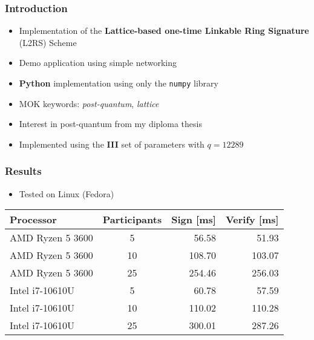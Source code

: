 \documentclass[%
  14pt,       				%
	t,                  %
	aspectratio=1610,   %
	unicode,						%
]{beamer}				    	%
\begin{document}
\disablenavigationsymbols

\maketitle


\begin{frame}[c]
	\frametitle{Introduction}
	\large{
		\begin{itemize}
			\item Implementation of the \textbf{Lattice-based one-time Linkable Ring Signature} (L2RS) Scheme
			\item Demo application using simple networking
			\item \textbf{Python} implementation using only the \texttt{numpy} library
			\item MOK keywords: \textit{post-quantum}, \textit{lattice}
			\item Interest in post-quantum from my diploma thesis
			\item Implemented using the \textbf{III} set of parameters with $q=12289$
		\end{itemize}
	}
\end{frame}


\begin{frame}[c]
	\frametitle{Results}
	\large{
		\begin{itemize}
			\item Tested on Linux (Fedora)
		\end{itemize}
	}
	\begin{table}[htbp]
		\centering
		\begin{tabular}{|l|c|r|r|}
			\hline
			Processor        & Participants & Sign [ms] & Verify [ms] \\
			\hline
			AMD Ryzen 5 3600 & 5            & 56.58     & 51.93       \\
			AMD Ryzen 5 3600 & 10           & 108.70    & 103.07      \\
			AMD Ryzen 5 3600 & 25           & 254.46    & 256.03      \\
			Intel i7-10610U  & 5            & 60.78     & 57.59       \\
			Intel i7-10610U  & 10           & 110.02    & 110.28      \\
			Intel i7-10610U  & 25           & 300.01    & 287.26      \\
			\hline
		\end{tabular}
	\end{table}
\end{frame}
\end{document}
